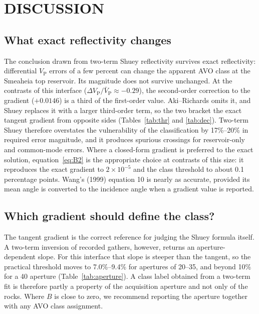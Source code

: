 \documentclass[11pt]{article}
\newcommand{\VP}{V_\mathrm{P}}
\begin{document}
\section*{DISCUSSION}

\subsection*{What exact reflectivity changes}

The conclusion drawn from two-term Shuey reflectivity survives exact reflectivity: differential $\VP$ errors of a few percent can change the apparent AVO class at the Smeaheia top reservoir. Its magnitude does not survive unchanged. At the contrasts of this interface ($\Delta\VP/\bar V_\mathrm{P}\approx-0.29$), the second-order correction to the gradient ($+0.0146$) is a third of the first-order value. Aki--Richards omits it, and Shuey replaces it with a larger third-order term, so the two bracket the exact tangent gradient from opposite sides (Tables~\ref{tab:thr} and \ref{tab:dec}). Two-term Shuey therefore overstates the vulnerability of the classification by 17\%--20\% in required error magnitude, and it produces spurious crossings for reservoir-only and common-mode errors. Where a closed-form gradient is preferred to the exact solution, equation~\ref{eq:B2} is the appropriate choice at contrasts of this size: it reproduces the exact gradient to $2\times10^{-5}$ and the class threshold to about 0.1 percentage points. Wang's (1999) equation 10 is nearly as accurate, provided its mean angle is converted to the incidence angle when a gradient value is reported.

\subsection*{Which gradient should define the class?}

The tangent gradient is the correct reference for judging the Shuey formula itself. A two-term inversion of recorded gathers, however, returns an aperture-dependent slope. For this interface that slope is steeper than the tangent, so the practical threshold moves to 7.0\%--9.4\% for apertures of 20\textdegree--35\textdegree, and beyond 10\% for a 40\textdegree{} aperture (Table~\ref{tab:aperture}). A class label obtained from a two-term fit is therefore partly a property of the acquisition aperture and not only of the rocks. Where $B$ is close to zero, we recommend reporting the aperture together with any AVO class assignment.
\end{document}
